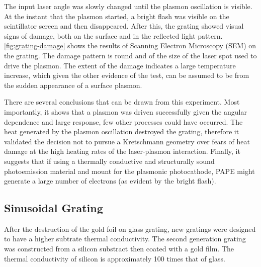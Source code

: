 The input laser angle was slowly changed until the plasmon oscillation is visible.
At the instant that the plasmon started, a bright flash was visible on the scintillator screen and then disappeared.
After this, the grating showed visual signs of damage, both on the surface and in the reflected light pattern.
\ref{fig:grating-damage} shows the results of Scanning Electron Microscopy (SEM) on the grating.
The damage pattern is round and of the size of the laser spot used to drive the plasmon.
The extent of the damage indicates a large temperature increase, which given the other evidence of the test, can be assumed to be from the sudden appearance of a surface plasmon.

There are several conclusions that can be drawn from this experiment.
Most importantly, it shows that a plasmon was driven successfully given the angular dependence and large response, few other processes could have occurred.
The heat generated by the plasmon oscillation destroyed the grating, therefore it validated the decision not to pursue a Kretschmann geometry over fears of heat damage at the high heating rates of the laser-plasmon interaction.
Finally, it suggests that if using a thermally conductive and structurally sound photoemission material and mount for the plasmonic photocathode, PAPE might generate a large number of electrons (as evident by the bright flash).

\subsection{Sinusoidal Grating}

After the destruction of the gold foil on glass grating, new gratings were designed to have a higher subtrate thermal conductivity.
The second generation grating was constructed from a silicon substract then coated with a gold film.
The thermal conductivity of silicon is approximately 100 times that of glass. %

